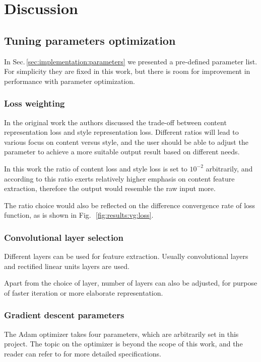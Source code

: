 
\chapter{Discussion}
\label{chap:discussion}


\section{Tuning parameters optimization}
\label{sec:discussion:parameter}

In Sec.\,\ref{sec:implementation:parameters} we presented a pre-defined parameter list.
For simplicity they are fixed in this work,
but there is room for improvement in performance with parameter optimization.

\subsection{Loss weighting}
In the original work \cite{Gatys:2016gj} the authors discussed the trade-off
between content representation loss and style representation loss.
Different ratios will lead to various focus on content versus style,
and the user should be able to adjust the parameter to achieve a more suitable output result
based on different needs.

In this work the ratio of content loss and style loss is set to $10^{-2}$ arbitrarily,
and according to \cite{Gatys:2016gj} this ratio exerts relatively higher emphasis on content feature extraction,
therefore the output would resemble the raw input more.

The ratio choice would also be reflected on the difference convergence rate of loss function,
as is shown in Fig.\,~\ref{fig:results:vg:loss}.

\subsection{Convolutional layer selection}
Different layers can be used for feature extraction.
Usually convolutional layers and rectified linear units layers are used.

Apart from the choice of layer, number of layers can also be adjusted,
for purpose of faster iteration or more elaborate representation.

\subsection{Gradient descent parameters}
The Adam optimizer takes four parameters, which are arbitrarily set in this project.
The topic on the optimizer is beyond the scope of this work,
and the reader can refer to \cite{kingma2014adam} for more detailed specifications.



